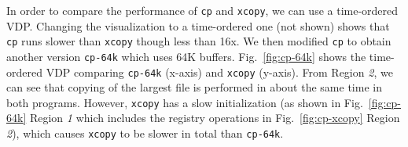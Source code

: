 
In order to compare the performance of {\tt cp} and {\tt xcopy},
we can use a time-ordered VDP.
Changing the visualization to a time-ordered one (not shown)
shows that {\tt cp} runs slower than {\tt xcopy} though less than 16x.
We then modified {\tt cp} to obtain another version
{\tt cp-64k} which uses 64K buffers.
Fig.~\ref{fig:cp-64k} shows the time-ordered VDP comparing
{\tt cp-64k} (x-axis) and {\tt xcopy} (y-axis).
From Region {\em 2}, we can see that copying of the largest file
is performed in about the same time in both programs.
However, {\tt xcopy} has a slow initialization 
(as shown in Fig.~\ref{fig:cp-64k} Region {\em 1} which includes the registry
operations in Fig.~\ref{fig:cp-xcopy} Region {\em 2}),
which causes {\tt xcopy} to be slower in total than {\tt cp-64k}.



